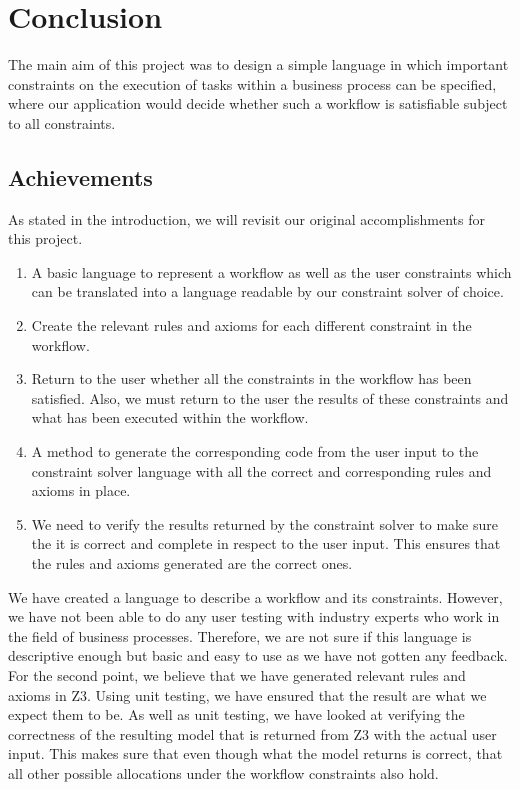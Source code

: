 \documentclass[a4paper]{report}
\begin{document}
\chapter{Conclusion}
The main aim of this project was to design a simple language in which important constraints on the execution of tasks within a business process can be specified, where our application would decide whether such a workflow is satisfiable subject to all constraints.\\

\section{Achievements}
As stated in the introduction, we will revisit our original accomplishments for this project.
\begin{enumerate}
\item A basic language to represent a workflow as well as the user constraints which can be translated into a language readable by our constraint solver of choice.
\item Create the relevant rules and axioms for each different constraint in the workflow.
\item Return to the user whether all the constraints in the workflow has been satisfied. Also, we must return to the user the results of these constraints and what has been executed within the workflow.
\item A method to generate the corresponding code from the user input to the constraint solver language with all the correct and corresponding rules and axioms in place. 
\item We need to verify the results returned by the constraint solver to make sure the it is correct and complete in respect to the user input. This ensures that the rules and axioms generated are the correct ones. 
\end{enumerate}

We have created a language to describe  a workflow and its constraints. However, we have not been able to do any user testing with industry experts who work in the field of business processes. Therefore, we are not sure if this language is descriptive enough but basic and easy to use as we have not gotten any feedback. \\

For the second point, we believe that we have generated relevant rules and axioms in Z3. Using unit testing, we have ensured that the result are what we expect them to be. As well as unit testing, we have looked at verifying the correctness of the resulting model that is returned from Z3 with the actual user input. This makes sure that even though what the model returns is correct, that all other possible allocations under the workflow constraints also hold. \\
\end{document}
